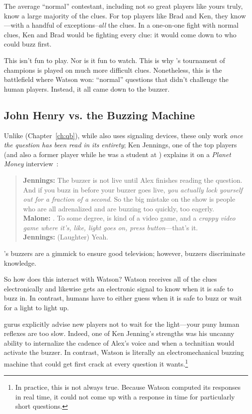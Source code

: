 The average ``normal'' \jeopardy{} contestant, including not so great
players like yours truly, know a large majority of the clues.
%
For top players like Brad and Ken, they know---with a handful of
exceptions--\emph{all} the clues.
%
In a one-on-one fight with normal clues, Ken and Brad would be
fighting every clue: it would come down to who could buzz first.

This isn't fun to play.
%
Nor is it fun to watch.
%
This is why \jeopardyp{}'s tournament of champions is played on much more difficult clues.
%
Nonetheless, this is the battlefield where Watson won: ``normal'' questions that didn't challenge the human players.
%
Instead, it all came down to the buzzer.

\subsection{John Henry vs. the Buzzing Machine}

Unlike \qb{} (Chapter~\ref{ch:qb}), while \jeopardy{} also uses
signaling devices, these only work \emph{once the question has been
read in its entirety}; Ken Jennings, one of the top \jeopardy{}
players (and also a former \qb{} player while he was a student at ) explains it on a \textit{Planet Money}
interview~\cite{malone-19}:
\begin{quote}
{\bf Jennings:} The buzzer is
    not live until Alex finishes reading the question. And if you buzz
    in before your buzzer goes live, \emph{you actually lock yourself out
    for a fraction of a second}. So the big mistake on the show is
    people who are all adrenalized and are buzzing too quickly, too
    eagerly. \\
{\bf Malone:} . To some degree, \jeopardy{} is kind of a video game, and a \emph{crappy video game where it's, like, light goes on, press button}---that's it. \\
{\bf Jennings:} (Laughter) Yeah. \\
\end{quote}
\jeopardy{}'s buzzers are a gimmick to ensure good television; however, \qb{} buzzers discriminate knowledge.

So how does this interact with Watson?
%
Watson receives all of the clues electronically and likewise gets an electronic signal to know when it is safe to buzz in.
%
In contrast, humans have to either guess when it is safe to buzz or wait for a light to light up.

\jeopardy{} gurus explicitly advise new players not to wait for the light---your puny human reflexes are too slow.
%
Indeed, one of Ken Jenning's strengths was his uncanny ability to
internalize the cadence of Alex's voice and when a technitian would
activate the buzzer.
%
In contrast, Watson is literally an electromechanical buzzing machine
that could get first crack at every question it wants.\footnote{In
practice, this is not always true.  Because Watson computed its
responses in real time, it could not come up with a response in time
for particularly short questions.}

